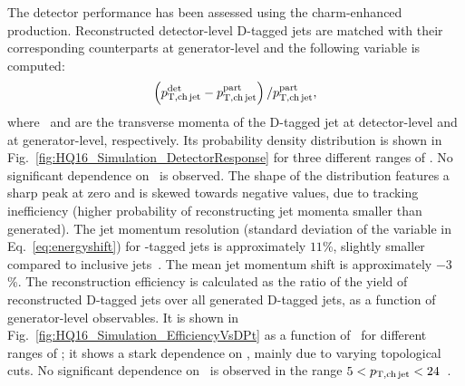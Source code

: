 \documentclass[a4paper]{jpconf}
\begin{document}
The detector performance has been assessed using the charm-enhanced production. 
Reconstructed detector-level D-tagged jets are matched with their corresponding counterparts at generator-level and the following variable is computed:
\begin{equation}
\left( p_{\mathrm{T,ch\,jet}}^{\mathrm{det}} - p_{\mathrm{T,ch\,jet}}^{\mathrm{part}} \right) / p_{\mathrm{T,ch\,jet}}^{\mathrm{part}},
\label{eq:energyshift}
\end{equation}
where \ptchjetdet\ and \ptchjetgen are the transverse momenta of the D-tagged jet at detector-level and at generator-level, respectively.
Its probability density distribution is shown in Fig.~\ref{fig:HQ16_Simulation_DetectorResponse} for three different ranges of \ptchjetgen. No significant dependence on \ptchjetgen\ is observed.
The shape of the distribution features a sharp peak at zero and is skewed towards negative values, due to tracking inefficiency (higher probability of
reconstructing jet momenta smaller than generated). The jet momentum resolution (standard deviation of the variable in Eq.~\ref{eq:energyshift}) for \Dzero-tagged jets is approximately \mbox{$11$\%}, 
slightly smaller compared to inclusive jets~\cite{ALICE:2015e}. The mean jet momentum shift is approximately \mbox{$-3$\%}.
The reconstruction efficiency is calculated as the ratio of the yield of reconstructed D-tagged jets over all generated D-tagged jets, as a function of generator-level observables.
It is shown in Fig.~\ref{fig:HQ16_Simulation_EfficiencyVsDPt} as a function of \ptd\ for different ranges of \ptchjet; it shows a stark dependence on \ptd, mainly due to
varying topological cuts. No significant dependence on \ptchjet\ is observed in the range $5<p_{\mathrm{T,ch\, jet}}<24$~\GeVc.
\end{document}

